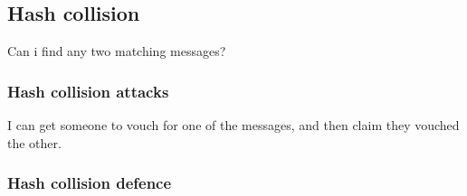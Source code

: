 
\subsection{Hash collision}

Can i find any two matching messages?

\subsubsection{Hash collision attacks}

I can get someone to vouch for one of the messages, and then claim they vouched the other.

\subsubsection{Hash collision defence}


